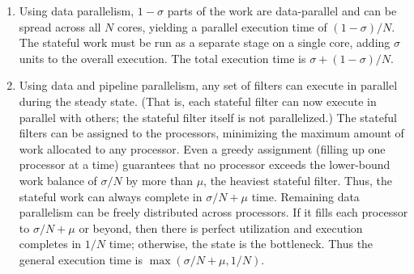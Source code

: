 \begin{enumerate}
\item Using data parallelism, $1-\sigma$ parts of the work are
data-parallel and can be spread across all $N$ cores, yielding a
parallel execution time of $(1-\sigma)/N$.  The stateful work must be
run as a separate stage on a single core, adding $\sigma$ units to the
overall execution.  The total execution time is $\sigma+(1-\sigma)/N$.

\item Using data and pipeline parallelism, any set of filters can
execute in parallel during the steady state.  (That is, each stateful
filter can now execute in parallel with others; the stateful filter
itself is not parallelized.)  The stateful filters can be assigned to
the processors, minimizing the maximum amount of work allocated to any
processor.  Even a greedy assignment (filling up one processor at a
time) guarantees that no processor exceeds the lower-bound work
balance of $\sigma/N$ by more than $\mu$, the heaviest stateful
filter.  Thus, the stateful work can always complete in $\sigma/N+\mu$
time.  Remaining data parallelism can be freely distributed across
processors.  If it fills each processor to $\sigma/N+\mu$ or beyond,
then there is perfect utilization and execution completes in $1/N$
time; otherwise, the state is the bottleneck.  Thus the general
execution time is $\max(\sigma/N+\mu, 1/N)$.





\end{enumerate}

